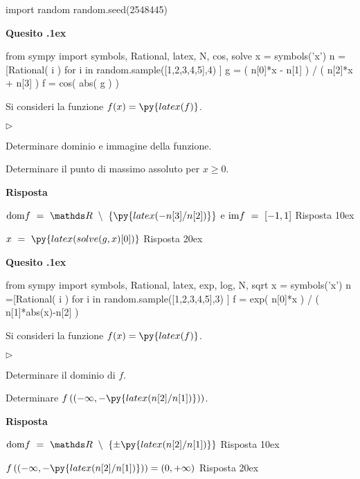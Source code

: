 \documentclass[11pt,twoside,a4paper]{article}
\newcommand{\mylabel}[1]{#1\hfill}
\renewenvironment{itemize}
  {\begin{list}{$\triangleright$}{%
   \setlength{\parskip}{0mm}
   \setlength{\topsep}{.4\baselineskip}
   \setlength{\rightmargin}{0mm}
   \setlength{\listparindent}{0mm}
   \setlength{\itemindent}{0mm}
   \setlength{\labelwidth}{2ex}
   \setlength{\itemsep}{.4\baselineskip}
   \setlength{\parsep}{0mm}
   \setlength{\partopsep}{0mm}
   \setlength{\labelsep}{1ex}
   \setlength{\leftmargin}{\labelwidth+\labelsep}
   \let\makelabel\mylabel}}{%
   \end{list}\vspace*{-1.3mm}}
\newcounter{quesito}
\newenvironment{question}{\bigskip\addtocounter{quesito}{1}\bigskip\bigskip\par\textbf{Quesito \thequesito.\kern1ex}}{\vspace{\parskip}}
\newenvironment{answer}{\par\textbf{Risposta\quad}}{\vspace{\parskip}}
\begin{document}
\begin{pycode}
import random
random.seed(2548445)
\end{pycode}

\begin{question}
\def\RR{{\mathds R}}
\def\dom{{\rm dom}}
\def\range{{\rm im}}
\begin{pycode}
from sympy import symbols, Rational, latex, N, cos, solve
x = symbols('x')
n =[Rational( i ) for i in random.sample([1,2,3,4,5],4) ]
g = ( n[0]*x - n[1] ) / ( n[2]*x + n[3] )
f = cos( abs( g ) )
\end{pycode}
Si consideri la funzione $\displaystyle f(x) = \py{latex(f)}$.
\begin{itemize}
\item[1.] Determinare dominio e immagine della funzione.
\item[2.] Determinare il punto di massimo assoluto per $x \geq 0$.
\end{itemize}
\begin{answer}

{\color{blue}
$\displaystyle \dom f \ =\ \RR\ \setminus\ \left\{\py{latex(-n[3]/n[2])}\right\} $
\quad e\quad 
$\range f \ =\ [-1, 1]$ 
\hfill Risposta 1\kern0ex}

{\color{blue}
$\displaystyle x\ =\ \py{latex(solve(g,x)[0])}$
\hfill Risposta 2\kern0ex}

\end{answer}
\end{question}
\begin{question}
\def\RR{{\mathds R}}
\def\dom{{\rm dom}}
\def\range{{\rm im}}
\begin{pycode}
from sympy import symbols, Rational, latex, exp, log, N, sqrt
x = symbols('x')
n =[Rational( i ) for i in random.sample([1,2,3,4,5],3) ]
f = exp( n[0]*x ) / ( n[1]*abs(x)-n[2] )
\end{pycode}
Si consideri la funzione $\displaystyle f(x) = \py{latex(f)} $.
\begin{itemize}
\item[1.] Determinare il dominio di $f$.
\item[2.] Determinare $\displaystyle f\left((-\infty, -\py{latex(n[2] / n[1])})\right)$.
\end{itemize}
\begin{answer}

{\color{blue}
$\displaystyle  \dom f \ =\ \RR\ \setminus\ \left\{\pm\py{latex(n[2] / n[1])}\right\} $ 
\hfill Risposta 1\kern0ex}

{\color{blue}
$\displaystyle f\left((-\infty, -\py{latex(n[2] / n[1])})\right) = (0, +\infty)$
\hfill Risposta 2\kern0ex}

\end{answer}
\end{question}
\end{document}
